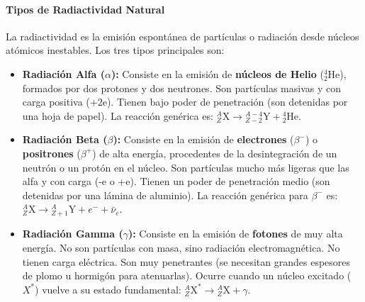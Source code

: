 \paragraph*{Tipos de Radiactividad Natural}
La radiactividad es la emisión espontánea de partículas o radiación desde núcleos atómicos inestables. Los tres tipos principales son:
\begin{itemize}
    \item \textbf{Radiación Alfa ($\alpha$):} Consiste en la emisión de \textbf{núcleos de Helio} (${}_2^4\text{He}$), formados por dos protones y dos neutrones. Son partículas masivas y con carga positiva (+2e). Tienen bajo poder de penetración (son detenidas por una hoja de papel). La reacción genérica es: ${}_Z^A\text{X} \to {}_{Z-2}^{A-4}\text{Y} + {}_2^4\text{He}$.
    \item \textbf{Radiación Beta ($\beta$):} Consiste en la emisión de \textbf{electrones} ($\beta^-$) o \textbf{positrones} ($\beta^+$) de alta energía, procedentes de la desintegración de un neutrón o un protón en el núcleo. Son partículas mucho más ligeras que las alfa y con carga (-e o +e). Tienen un poder de penetración medio (son detenidas por una lámina de aluminio). La reacción genérica para $\beta^-$ es: ${}_Z^A\text{X} \to {}_{Z+1}^{A}\text{Y} + e^- + \bar{\nu}_e$.
    \item \textbf{Radiación Gamma ($\gamma$):} Consiste en la emisión de \textbf{fotones} de muy alta energía. No son partículas con masa, sino radiación electromagnética. No tienen carga eléctrica. Son muy penetrantes (se necesitan grandes espesores de plomo u hormigón para atenuarlas). Ocurre cuando un núcleo excitado ($X^*$) vuelve a su estado fundamental: ${}_Z^A\text{X}^* \to {}_Z^A\text{X} + \gamma$.
\end{itemize}

